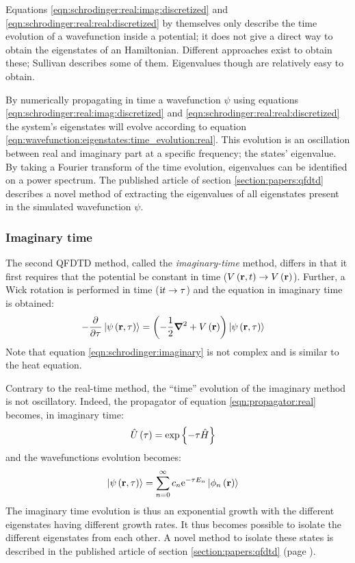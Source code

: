Equations \eqref{eqn:schrodinger:real:imag:discretized} and
\eqref{eqn:schrodinger:real:real:discretized} by themselves only describe the
time evolution of a wavefunction inside a potential; it does not give a direct
way to obtain the eigenstates of an Hamiltonian. Different approaches exist to
obtain these; Sullivan describes some of them. Eigenvalues though are
relatively easy to obtain.

By numerically propagating in time a wavefunction $\psi$ using equations
\eqref{eqn:schrodinger:real:imag:discretized} and
\eqref{eqn:schrodinger:real:real:discretized} the system's eigenstates will
evolve according to equation
\eqref{eqn:wavefunction:eigenstates:time_evolution:real}. This evolution is an
oscillation between real and imaginary part at a specific frequency; the states'
eigenvalue. By taking a Fourier transform of the time evolution, eigenvalues
can be identified on a power spectrum. The published article of section
\ref{section:papers:qfdtd} describes a novel method of extracting the
eigenvalues of all eigenstates present in the simulated wavefunction $\psi$.



\subsubsection{Imaginary time}

The second QFDTD method, called the \textit{imaginary-time} method, differs in
that it first requires that the potential be constant in time ($V\left( \textbf{r}, t \right)
\rightarrow V\left( \textbf{r} \right)$). Further, a Wick rotation is performed in time ($\textrm{i} t
\rightarrow \tau$) and the \schrodinger equation in imaginary time is
obtained:
\begin{align}
- \frac{\partial^{{}} }{\partial {\tau}^{{}}} \left| \psi\left( \textbf{r}, \tau \right) \right>
    & = \left( -\frac{1}{2} \bm{\nabla}^2 + V\left( \textbf{r} \right)  \right) \left| \psi\left( \textbf{r}, \tau \right) \right>
\label{eqn:schrodinger:imaginary}
\end{align}
Note that equation \eqref{eqn:schrodinger:imaginary} is not complex and is
similar to the heat equation.


Contrary to the real-time method, the ``time'' evolution of the imaginary
method is not oscillatory. Indeed, the propagator of equation
\eqref{eqn:propagator:real} becomes, in imaginary time:
\begin{align}
\hat{U}\left( \tau \right) & = \exp{ \left\{  - \tau  \hat{H} \right\}} \label{eqn:propagator:imag}
\end{align}
and the wavefunctions evolution becomes:
\begin{align}
\left| \psi\left( \textbf{r}, \tau \right) \right>
 & = \sum_{n=0}^{\infty} c_n \textrm{e}^{ - \tau E_n } \left| \phi_n\left( \textbf{r} \right) \right>
\end{align}
The imaginary time evolution is thus an exponential growth with the different
eigenstates having different growth rates. It thus becomes possible to isolate
the different eigenstates from each other. A novel method to isolate these
states is described in the published article of section
\ref{section:papers:qfdtd} (page \pageref{section:papers:qfdtd}).

